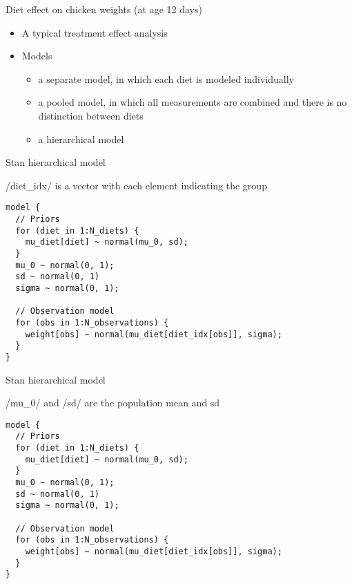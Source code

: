 \documentclass[finnish,english,t]{beamer}
\begin{document}
\begin{frame}{Diet effect on chicken weights (at age 12 days)}

  \begin{itemize}
  \item A typical treatment effect analysis
  \item Models
    \begin{itemize}
    \item a separate model, in which each diet is modeled individually
    \item a pooled model, in which all measurements are combined and there is no distinction between diets
    \item a hierarchical model
    \end{itemize}
  \end{itemize}
  
\end{frame}

\begin{frame}[fragile]{Stan hierarchical model}

  \vspace{-0.5\baselineskip}

\rinline/diet_idx/ is a vector with each element indicating the group

\vspace{-0.5\baselineskip}
{\small
\begin{verbatim}
model {
  // Priors
  for (diet in 1:N_diets) {
    mu_diet[diet] ~ normal(mu_0, sd);
  }
  mu_0 ~ normal(0, 1);
  sd ~ normal(0, 1)
  sigma ~ normal(0, 1);
  
  // Observation model
  for (obs in 1:N_observations) {
    weight[obs] ~ normal(mu_diet[diet_idx[obs]], sigma);
  }
}
\end{verbatim}
}
\end{frame}

\begin{frame}[fragile]{Stan hierarchical model}

  \vspace{-0.5\baselineskip}

\rinline/mu_0/ and \rinline/sd/ are the population mean and sd
  
\vspace{-0.5\baselineskip}
{\small
\begin{verbatim}
model {
  // Priors
  for (diet in 1:N_diets) {
    mu_diet[diet] ~ normal(mu_0, sd);
  }
  mu_0 ~ normal(0, 1);
  sd ~ normal(0, 1)
  sigma ~ normal(0, 1);
  
  // Observation model
  for (obs in 1:N_observations) {
    weight[obs] ~ normal(mu_diet[diet_idx[obs]], sigma);
  }
}
\end{verbatim}
}
\end{frame}
\end{document}
